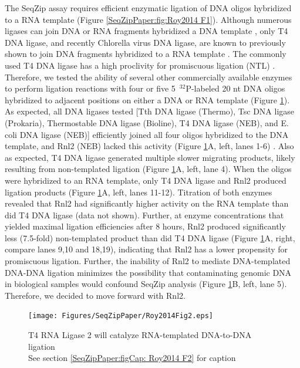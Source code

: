 		The SeqZip assay requires efficient enzymatic ligation of DNA oligos hybridized to a RNA template (Figure \ref{SeqZipPaper:fig:Roy2014 F1}). Although numerous ligases can join DNA or RNA fragments hybridized a DNA template \citep{Bullard2006}, only T4 DNA ligase, and recently Chlorella virus DNA ligase, are known to previously shown to join DNA fragments hybridized to a RNA template \citep{Nilsson2001,Lohman2013c}. The commonly used T4 DNA ligase has a high proclivity for promiscuous ligation (NTL) \citep{Kuhn2005}. Therefore, we tested the ability of several other commercially available enzymes to perform ligation reactions with four or five 5\textprime~$^{32}$P-labeled 20 nt DNA oligos hybridized to adjacent positions on either a DNA or RNA template (Figure \ref{SeqZipPaper:fig:Roy2014 F2}). As expected, all DNA ligases tested [Tth DNA ligase (Thermo), Tsc DNA ligase (Prokaria), Thermostable DNA ligase (Bioline), T4 DNA ligase (NEB), and E. coli DNA ligase (NEB)] efficiently joined all four oligos hybridized to the DNA template, and Rnl2 (NEB) lacked this activity (Figure \ref{SeqZipPaper:fig:Roy2014 F2}A, left, lanes 1-6) \citep{Bullard2006}. Also as expected, T4 DNA ligase generated multiple slower migrating products, likely resulting from non-templated ligation (Figure \ref{SeqZipPaper:fig:Roy2014 F2}A, left, lane 4). When the oligos were hybridized to an RNA template, only T4 DNA ligase and Rnl2 produced ligation products (Figure \ref{SeqZipPaper:fig:Roy2014 F2}A, left, lanes 11-12). Titration of both enzymes revealed that Rnl2 had significantly higher activity on the RNA template than did T4 DNA ligase (data not shown). Further, at enzyme concentrations that yielded maximal ligation efficiencies after 8 hours, Rnl2 produced significantly less (7.5-fold) non-templated product than did T4 DNA ligase (Figure \ref{SeqZipPaper:fig:Roy2014 F2}A, right, compare lanes 9,10 and 18,19), indicating that Rnl2 has a lower propensity for promiscuous ligation. Further, the inability of Rnl2 to mediate DNA-templated DNA-DNA ligation minimizes the possibility that contaminating genomic DNA in biological samples would confound SeqZip analysis (Figure \ref{SeqZipPaper:fig:Roy2014 F2}B, left, lane 5). Therefore, we decided to move forward with Rnl2.

		\begin{figure} %
			\centering 
			\texttt{[image: Figures/SeqZipPaper/Roy2014Fig2.eps]}
			\caption[T4 RNA Ligase 2 will catalyze RNA-templated DNA-to-DNA ligation]
			{
				T4 RNA Ligase 2 will catalyze RNA-templated DNA-to-DNA ligation \\[0.25cm]
				See section \ref{SeqZipPaper:figCap: Roy2014 F2} for caption
				}
			\label{SeqZipPaper:fig:Roy2014 F2}
			\end{figure}


